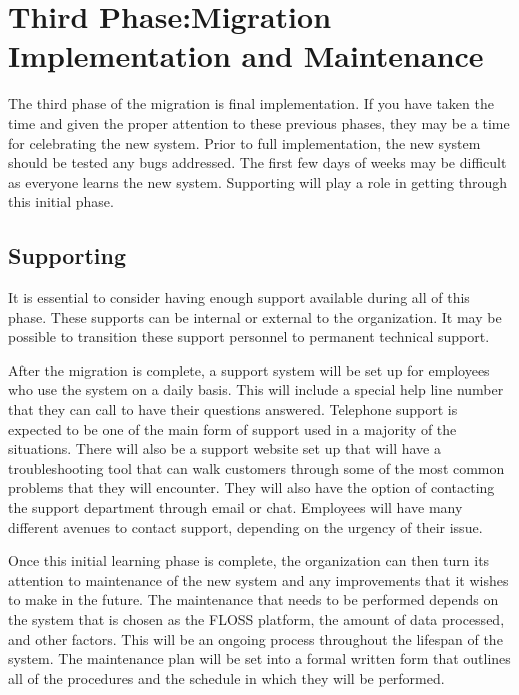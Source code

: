      \section{Third Phase:Migration Implementation and Maintenance}
     \label{Implementation}
     
     The third phase of the migration is final implementation. If you have taken the time and given the proper attention to these previous phases, they may be a time for celebrating the new system. Prior to full implementation, the new system should be tested any bugs addressed. The first few days of weeks may be difficult as everyone learns the new system. Supporting will play a role in getting through this initial phase. 
     \subsection {Supporting}
     
     It is essential to consider having enough support available during all of this phase. These supports can be internal or external to the organization. It may be possible to transition these support personnel to permanent technical support. 
     
     After the migration is complete, a support system will be set up for employees who use the system on a daily basis. This will include a special help line number that they can call to have their questions answered. Telephone support is expected to be one of the main form of support used in a majority of the situations. 	There will also be a support website set up that will have a troubleshooting tool that can walk customers through some of the most common problems that they will encounter. They will also have the option of contacting the support department through email or chat. Employees will have many different avenues to contact support, depending on the urgency of their issue. 
     
     Once this initial learning phase is complete, the organization can then turn its attention to maintenance of the new system and any improvements that it wishes to make in the future. The maintenance that needs to be performed depends on the system that is chosen as the FLOSS platform, the amount of data processed, and other factors. This will be an ongoing process throughout the lifespan of the system. The maintenance plan will be set into a formal written form that outlines all of the procedures and the schedule in which they will be performed. 

